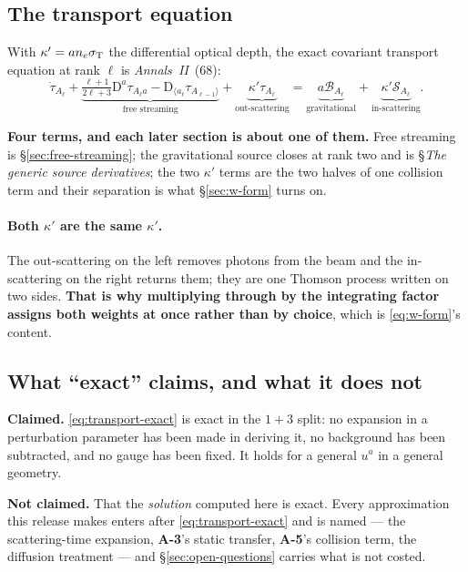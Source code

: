 \subsection{The transport equation}

With $\kappa'=an_e\sigma_{\rm T}$ the differential optical depth, the exact
covariant transport equation at rank $\ell$ is \emph{Annals~II}~(68):
\begin{equation}
  \dot\tau_{A_\ell}
  +\underbrace{\tfrac{\ell+1}{2\ell+3}\mathrm D^a\tau_{A_\ell a}
               -\mathrm D_{\langle a_\ell}\tau_{A_{\ell-1}\rangle}}_{\text{free streaming}}
  +\underbrace{\kappa'\tau_{A_\ell}}_{\text{out-scattering}}
  =\underbrace{a\mathcal B_{A_\ell}}_{\text{gravitational}}
  +\underbrace{\kappa'\mathcal S_{A_\ell}}_{\text{in-scattering}} .
  \label{eq:transport-exact}
\end{equation}

\textbf{Four terms, and each later section is about one of them.} Free
streaming is \S\ref{sec:free-streaming}; the gravitational source closes at
rank two and is \S\emph{The generic source derivatives}; the two $\kappa'$
terms are the two halves of one collision term and their separation is what
\S\ref{sec:w-form} turns on.

\paragraph{Both $\kappa'$ are the same $\kappa'$.} The out-scattering on the
left removes photons from the beam and the in-scattering on the right returns
them; they are one Thomson process written on two sides. \textbf{That is why
multiplying through by the integrating factor assigns both weights at once
rather than by choice}, which is \eqref{eq:w-form}'s content.

\subsection{What ``exact'' claims, and what it does not}

\textbf{Claimed.} \eqref{eq:transport-exact} is exact in the $1+3$ split: no
expansion in a perturbation parameter has been made in deriving it, no
background has been subtracted, and no gauge has been fixed. It holds for a
general $u^a$ in a general geometry.

\textbf{Not claimed.} That the \emph{solution} computed here is exact. Every
approximation this release makes enters after \eqref{eq:transport-exact} and
is named --- the scattering-time expansion, \textbf{A-3}'s static transfer,
\textbf{A-5}'s collision term, the diffusion treatment --- and
\S\ref{sec:open-questions} carries what is not costed.

